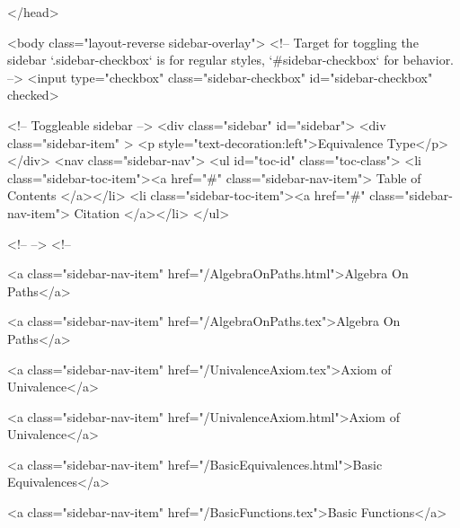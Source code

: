   
</head>




  <body class="layout-reverse sidebar-overlay">
    <!-- Target for toggling the sidebar `.sidebar-checkbox` is for regular
     styles, `#sidebar-checkbox` for behavior. -->
<input type="checkbox" class="sidebar-checkbox" id="sidebar-checkbox" checked>

<!-- Toggleable sidebar -->
<div class="sidebar" id="sidebar">
  <div class="sidebar-item" >
    <p style="text-decoration:left">Equivalence Type</p>
  </div>
  <nav class="sidebar-nav">
    <ul id="toc-id" class="toc-class">
  <li class="sidebar-toc-item"><a href="#" class="sidebar-nav-item"> Table of Contents </a></li>
  <li class="sidebar-toc-item"><a href="#" class="sidebar-nav-item"> Citation </a></li>
</ul>


    <!--  -->
    <!-- 
      
    
      
    
      
    
      
    
      
        
      
    
      
        
          <a class="sidebar-nav-item" href="/AlgebraOnPaths.html">Algebra On Paths</a>
        
      
    
      
        
          <a class="sidebar-nav-item" href="/AlgebraOnPaths.tex">Algebra On Paths</a>
        
      
    
      
        
          <a class="sidebar-nav-item" href="/UnivalenceAxiom.tex">Axiom of Univalence</a>
        
      
    
      
        
          <a class="sidebar-nav-item" href="/UnivalenceAxiom.html">Axiom of Univalence</a>
        
      
    
      
        
          <a class="sidebar-nav-item" href="/BasicEquivalences.html">Basic Equivalences</a>
        
      
    
      
        
          <a class="sidebar-nav-item" href="/BasicFunctions.tex">Basic Functions</a>
        
